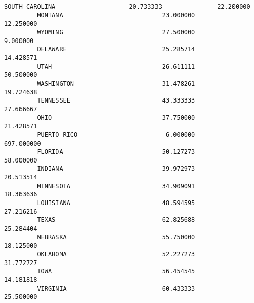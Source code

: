 \documentclass[11pt]{article}
\begin{document}
\begin{Verbatim}[commandchars=\\\{\}]
         SOUTH CAROLINA                    20.733333               22.200000   
         MONTANA                           23.000000               12.250000   
         WYOMING                           27.500000                9.000000   
         DELAWARE                          25.285714               14.428571   
         UTAH                              26.611111               50.500000   
         WASHINGTON                        31.478261               19.724638   
         TENNESSEE                         43.333333               27.666667   
         OHIO                              37.750000               21.428571   
         PUERTO RICO                        6.000000              697.000000   
         FLORIDA                           50.127273               58.000000   
         INDIANA                           39.972973               20.513514   
         MINNESOTA                         34.909091               18.363636   
         LOUISIANA                         48.594595               27.216216   
         TEXAS                             62.825688               25.284404   
         NEBRASKA                          55.750000               18.125000   
         OKLAHOMA                          52.227273               31.772727   
         IOWA                              56.454545               14.181818   
         VIRGINIA                          60.433333               25.500000   
         

\end{Verbatim}
\end{document}
